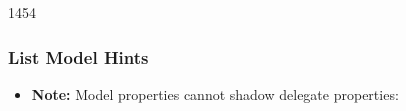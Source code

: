 \begin{slide}{1454}\frametitle{List Model Hints}

\begin{itemize}
\item \textbf{Note:} Model properties cannot shadow delegate properties:
\end{itemize}
\begin{qml}
\\
\\
\qtt{~~\}}\\
\vspace*{0.5em}
\\
\\
\\
\qtt{~~~~~~\}}\\
\qtt{~~\}}
\end{qml}

\end{slide}


